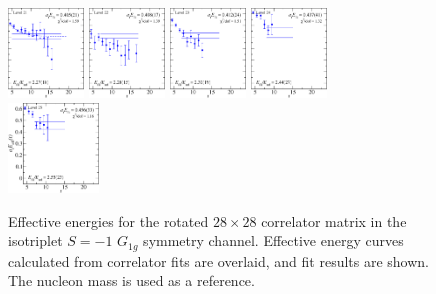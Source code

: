 \begin{figure}[H]
    \includegraphics[width=0.18\textwidth]{figures/sigmas/g1g/fits/fit_17.pdf}
    \includegraphics[width=0.18\textwidth]{figures/sigmas/g1g/fits/fit_2.pdf}
    \includegraphics[width=0.18\textwidth]{figures/sigmas/g1g/fits/fit_18.pdf}
    \includegraphics[width=0.18\textwidth]{figures/sigmas/g1g/fits/fit_25.pdf}\\[-0.35cm]
    \includegraphics[width=0.215\textwidth]{figures/sigmas/g1g/fits/fit_24.pdf}
    \caption{Effective energies for the rotated $28\times 28$ correlator matrix in the isotriplet $S=-1$ $G_{1g}$ symmetry channel. Effective energy curves calculated from correlator fits are overlaid, and fit results are shown. The nucleon mass is used as a reference.}\label{fig:g1g_fits}
\end{figure}

